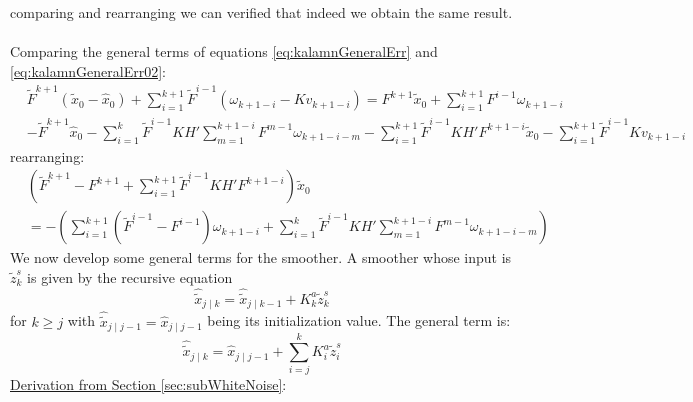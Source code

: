 \documentclass[oneside,12pt]{article}
\begin{document}
%
comparing and rearranging we can verified that indeed we obtain the same result.\\\\
%
Comparing the general terms of equations \ref{eq:kalamnGeneralErr} and \ref{eq:kalamnGeneralErr02}:
%
\begin{equation}
    \begin{split}
        &\tilde{F}^{k+1}(\tilde{x}_0 - \hat{x}_0) + \sum_{i=1}^{k+1} \tilde{F}^{i-1}(\omega_{k+1-i} - Kv_{k+1-i}) 
        = F^{k+1} \tilde{x}_0 + \sum_{i=1}^{k+1} F^{i-1} \omega_{k+1-i}\\
        &- \tilde{F}^{k+1} \hat{x}_0 - \sum_{i=1}^{k} \tilde{F}^{i-1} K H' \sum_{m=1}^{k+1-i} F^{m-1} \omega_{k+1-i-m} - \sum_{i=1}^{k+1} \tilde{F}^{i-1} K H' F^{k+1-i} \tilde{x}_0 - \sum_{i=1}^{k+1} \tilde{F}^{i-1} K v_{k+1-i}
    \end{split}
\end{equation}
%
rearranging:
%
\begin{equation}
    \begin{split}
        &(\tilde{F}^{k+1} - F^{k+1} + \sum_{i=1}^{k+1} \tilde{F}^{i-1} K H' F^{k+1-i})\tilde{x}_0\\
        &= -\left( \sum_{i=1}^{k+1} (\tilde{F}^{i-1} - F^{i-1}) \omega_{k+1-i} 
        + \sum_{i=1}^{k} \tilde{F}^{i-1} K H' \sum_{m=1}^{k+1-i} F^{m-1} \omega_{k+1-i-m} \right)
    \end{split}
\end{equation}
%
We now develop some general terms for the smoother. A smoother whose input is $\tilde{z}^s_k$ is given by the recursive equation
%
\begin{equation}
    \hat{\tilde{x}}_{j \mid k} = \hat{\tilde{x}}_{j \mid k-1} + K^a_k \tilde{z}^s_k
\end{equation}
%
for $k \geq j$ with $\hat{\tilde{x}}_{j \mid j-1} = \hat{x}_{j \mid j-1}$ being its initialization value. The general term is:
%
\begin{equation}\label{eq:smootherGeneral}
    \hat{\tilde{x}}_{j \mid k} = \hat{x}_{j \mid j-1} + \sum_{i=j}^{k} K^a_{i} \tilde{z}^s_{i}
\end{equation}
%
\underline{Derivation from Section \ref{sec:subWhiteNoise}}:\\\\
%
%
\end{document}

